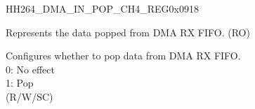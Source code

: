     
    \begin{register}{H}{H264\_DMA\_IN\_POP\_CH4\_REG}{0x0918}\label{regdesc:H264DMAINPOPCH4REG}
    \regnewline%
    \begin{regdesc}\begin{reglist}
    \label{fielddesc:H264DMAINFIFORDATACH4}\item [H264\_DMA\_INFIFO\_RDATA\_CH4] Represents the data popped from DMA RX FIFO. (RO)
    \label{fielddesc:H264DMAINFIFOPOPCH4}\item [H264\_DMA\_INFIFO\_POP\_CH4] Configures whether to pop data from DMA RX FIFO.\\
    0: No effect\\
    1: Pop\\ (R/W/SC)
    \end{reglist}\end{regdesc}
    \end{register}
    

